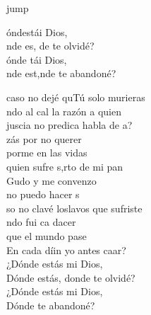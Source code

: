 \begin{cancion}jump\\
	\begin{chorus}%
		óndestái Dios, \\
		nde es, de te olvidé?  \\
		ónde tái Dios, \\
		nde est,nde te abandoné?  \jump\\
	\end{chorus}%
	caso no dejé quTú solo murieras\\
	ndo al cal la razón a quien\\
	juscia no predica habla de a?\\
	\jump
	zás por no querer \\
	porme en las vidas\\
	quien sufre s,rto de mi pan\\
	Gudo y me convenzo \\
	 no puedo hacer s\\
	\jump
	so no clavé loslavos que sufriste\\
	ndo fui ca dacer \\
	\jump
que el mundo pase\\
	En  cada díin yo antes caar? \\
	\jump
	\jump
¿Dónde estás mi Dios,\\
Dónde estás, donde te olvidé?\\
¿Dónde estás mi Dios,\\
Dónde te abandoné?\\
\end{cancion}%
